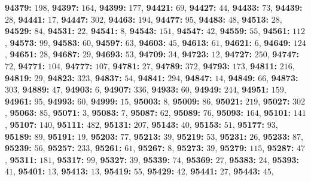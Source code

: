 \textsf{\bfseries 94379:} $198$, \textsf{\bfseries 94397:} $164$, \textsf{\bfseries 94399:} $177$, \textsf{\bfseries 94421:} $69$, \textsf{\bfseries 94427:} $44$, \textsf{\bfseries 94433:} $73$, \textsf{\bfseries 94439:} $28$, \textsf{\bfseries 94441:} $17$, \textsf{\bfseries 94447:} $302$, \textsf{\bfseries 94463:} $194$, \textsf{\bfseries 94477:} $95$, \textsf{\bfseries 94483:} $48$, \textsf{\bfseries 94513:} $28$, \textsf{\bfseries 94529:} $84$, \textsf{\bfseries 94531:} $22$, \textsf{\bfseries 94541:} $8$, \textsf{\bfseries 94543:} $151$, \textsf{\bfseries 94547:} $42$, \textsf{\bfseries 94559:} $55$, \textsf{\bfseries 94561:} $112$, \textsf{\bfseries 94573:} $99$, \textsf{\bfseries 94583:} $60$, \textsf{\bfseries 94597:} $63$, \textsf{\bfseries 94603:} $45$, \textsf{\bfseries 94613:} $61$, \textsf{\bfseries 94621:} $6$, \textsf{\bfseries 94649:} $124$, \textsf{\bfseries 94651:} $28$, \textsf{\bfseries 94687:} $29$, \textsf{\bfseries 94693:} $53$, \textsf{\bfseries 94709:} $34$, \textsf{\bfseries 94723:} $12$, \textsf{\bfseries 94727:} $250$, \textsf{\bfseries 94747:} $72$, \textsf{\bfseries 94771:} $104$, \textsf{\bfseries 94777:} $107$, \textsf{\bfseries 94781:} $27$, \textsf{\bfseries 94789:} $372$, \textsf{\bfseries 94793:} $173$, \textsf{\bfseries 94811:} $216$, \textsf{\bfseries 94819:} $29$, \textsf{\bfseries 94823:} $323$, \textsf{\bfseries 94837:} $54$, \textsf{\bfseries 94841:} $294$, \textsf{\bfseries 94847:} $14$, \textsf{\bfseries 94849:} $66$, \textsf{\bfseries 94873:} $303$, \textsf{\bfseries 94889:} $47$, \textsf{\bfseries 94903:} $6$, \textsf{\bfseries 94907:} $336$, \textsf{\bfseries 94933:} $60$, \textsf{\bfseries 94949:} $244$, \textsf{\bfseries 94951:} $159$, \textsf{\bfseries 94961:} $95$, \textsf{\bfseries 94993:} $60$, \textsf{\bfseries 94999:} $15$, \textsf{\bfseries 95003:} $8$, \textsf{\bfseries 95009:} $86$, \textsf{\bfseries 95021:} $219$, \textsf{\bfseries 95027:} $302$, \textsf{\bfseries 95063:} $85$, \textsf{\bfseries 95071:} $3$, \textsf{\bfseries 95083:} $7$, \textsf{\bfseries 95087:} $62$, \textsf{\bfseries 95089:} $76$, \textsf{\bfseries 95093:} $164$, \textsf{\bfseries 95101:} $141$, \textsf{\bfseries 95107:} $140$, \textsf{\bfseries 95111:} $482$, \textsf{\bfseries 95131:} $207$, \textsf{\bfseries 95143:} $40$, \textsf{\bfseries 95153:} $51$, \textsf{\bfseries 95177:} $93$, \textsf{\bfseries 95189:} $89$, \textsf{\bfseries 95191:} $19$, \textsf{\bfseries 95203:} $77$, \textsf{\bfseries 95213:} $39$, \textsf{\bfseries 95219:} $53$, \textsf{\bfseries 95231:} $26$, \textsf{\bfseries 95233:} $87$, \textsf{\bfseries 95239:} $56$, \textsf{\bfseries 95257:} $233$, \textsf{\bfseries 95261:} $61$, \textsf{\bfseries 95267:} $8$, \textsf{\bfseries 95273:} $39$, \textsf{\bfseries 95279:} $115$, \textsf{\bfseries 95287:} $47$, \textsf{\bfseries 95311:} $181$, \textsf{\bfseries 95317:} $99$, \textsf{\bfseries 95327:} $39$, \textsf{\bfseries 95339:} $74$, \textsf{\bfseries 95369:} $27$, \textsf{\bfseries 95383:} $24$, \textsf{\bfseries 95393:} $41$, \textsf{\bfseries 95401:} $13$, \textsf{\bfseries 95413:} $13$, \textsf{\bfseries 95419:} $55$, \textsf{\bfseries 95429:} $42$, \textsf{\bfseries 95441:} $27$, \textsf{\bfseries 95443:} $45$, 
